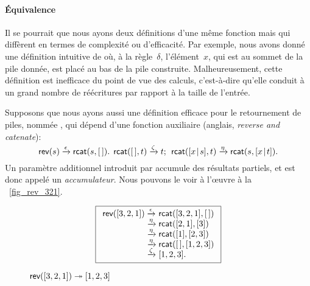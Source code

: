 \paragraph{Équivalence}

\hspace*{-2pt} Il se pourrait que nous ayons deux définitions d'une
même fonction mais qui diffèrent en termes de complexité ou
d'efficacité. Par exemple, nous avons donné une définition intuitive
de  où, à la
règle~\(\delta\), l'élément~\(x\), qui est au sommet de la pile
donnée, est placé au bas de la pile construite. Malheureusement, cette
définition est inefficace du point de vue des calculs, c'est-à-dire
qu'elle conduit à un grand nombre de réécritures par rapport à la
taille de l'entrée.

Supposons que nous ayons aussi une définition efficace pour le
retournement de piles, nommée , qui
dépend d'une fonction auxiliaire
(anglais, \emph{reverse and catenate}):
\begin{equation}
\textsf{rev}(s) \xrightarrow{\smash{\epsilon}} \textsf{rcat}(s,[\,]).\;\,
\textsf{rcat}([\,],t) \xrightarrow{\smash{\zeta}} t;\;\,
\textsf{rcat}([{x}\!\mid\!{s}],t) \xrightarrow{\smash{\eta}} 
                          \textsf{rcat}(s,[{x}\!\mid\!{t}]).
\label{def_rev}
\end{equation}
Un paramètre additionnel introduit par  accumule des
résultats partiels, et est donc appelé un
\emph{accumulateur}. Nous
pouvons le voir à l'{\oe}uvre à la \fig~\vref{fig_rev_321}.
\begin{figure}
\begin{equation*}
\boxed{%
\begin{array}{r@{\;}l@{\;}l}
\fun{rev}([3,2,1])
& \xrightarrow{\smash{\epsilon}} & \fun{rcat}([3,2,1],\el)\\
& \xrightarrow{\smash{\eta}}     & \fun{rcat}([2,1],[3])\\
& \xrightarrow{\smash{\eta}}     & \fun{rcat}([1],[2,3])\\
& \xrightarrow{\smash{\eta}}     & \fun{rcat}(\el,[1,2,3])\\
& \xrightarrow{\smash{\zeta}}    & [1,2,3].
\end{array}}
\end{equation*}
\caption{\(\textsf{rev}([3,2,1]) \twoheadrightarrow [1,2,3]\)
\label{fig_rev_321}}
\end{figure}

